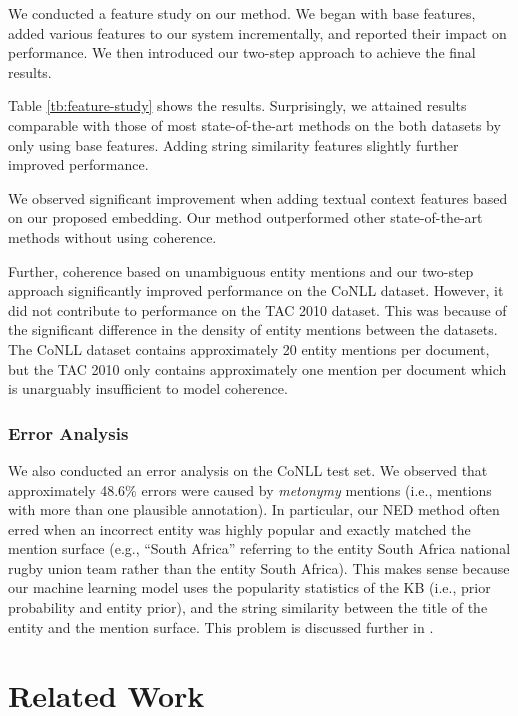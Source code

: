 \documentclass[11pt,letterpaper]{article}
\begin{document}
We conducted a feature study on our method.
We began with base features, added various features to our system incrementally, and reported their impact on performance.
We then introduced our two-step approach to achieve the final results.

Table \ref{tb:feature-study} shows the results.
Surprisingly, we attained results comparable with those of most state-of-the-art methods on the both datasets by only using base features.
Adding string similarity features slightly further improved performance.

We observed significant improvement when adding textual context features based on our proposed embedding.
Our method outperformed other state-of-the-art methods without using coherence.

Further, coherence based on unambiguous entity mentions and our two-step approach significantly improved performance on the CoNLL dataset.
However, it did not contribute to performance on the TAC 2010 dataset.
This was because of the significant difference in the density of entity mentions between the datasets.
The CoNLL dataset contains approximately 20 entity mentions per document, but the TAC 2010 only contains approximately one mention per document which is unarguably insufficient to model coherence.

\subsubsection{Error Analysis}

We also conducted an error analysis on the CoNLL test set.
We observed that approximately 48.6\% errors were caused by \textit{metonymy} mentions \cite{Ling2015} (i.e., mentions with more than one plausible annotation).
In particular, our NED method often erred when an incorrect entity was highly popular and exactly matched the mention surface (e.g., ``South Africa'' referring to the entity \textsf{South Africa national rugby union team} rather than the entity \textsf{South Africa}).
This makes sense because our machine learning model uses the popularity statistics of the KB (i.e., prior probability and entity prior), and the string similarity between the title of the entity and the mention surface.
This problem is discussed further in \cite{Ling2015}.

\section{Related Work}
\end{document}
